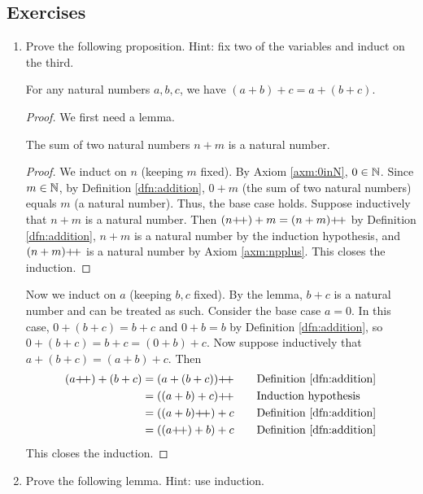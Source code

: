\documentclass[../main.tex]{subfiles}
\begin{document}
\subsection*{Exercises}
\begin{enumerate}[ref={\thesection.\arabic*}]
    \item \label{exr:2.2.1}Prove the following proposition. Hint: fix two of the variables and induct on the third.
    \begin{prp}\label{prp:associativity}
        For any natural numbers $a,b,c$, we have $(a+b)+c=a+(b+c)$.
        \begin{proof}
            We first need a lemma.
            \begin{lem}\label{lem:sumNaturalsIsNatural}
                The sum of two natural numbers $n+m$ is a natural number.
                \begin{proof}
                    We induct on $n$ (keeping $m$ fixed). By Axiom \ref{axm:0inN}, $0\in\mathbb{N}$. Since $m\in\mathbb{N}$, by Definition \ref{dfn:addition}, $0+m$ (the sum of two natural numbers) equals $m$ (a natural number). Thus, the base case holds. Suppose inductively that $n+m$ is a natural number. Then $(n{+\!+})+m=(n+m){+\!+}$ by Definition \ref{dfn:addition}, $n+m$ is a natural number by the induction hypothesis, and $(n+m){+\!+}$ is a natural number by Axiom \ref{axm:npplus}. This closes the induction.
                \end{proof}
            \end{lem}
            Now we induct on $a$ (keeping $b,c$ fixed). By the lemma, $b+c$ is a natural number and can be treated as such. Consider the base case $a=0$. In this case, $0+(b+c)=b+c$ and $0+b=b$ by Definition \ref{dfn:addition}, so $0+(b+c)=b+c=(0+b)+c$. Now suppose inductively that $a+(b+c)=(a+b)+c$. Then
            \begin{align*}
                (a\pplus)+(b+c) &= (a+(b+c))\pplus\tag*{Definition \ref{dfn:addition}}\\
                &= ((a+b)+c)\pplus\tag*{Induction hypothesis}\\
                &= ((a+b)\pplus)+c\tag*{Definition \ref{dfn:addition}}\\
                &= ((a\pplus)+b)+c\tag*{Definition \ref{dfn:addition}}
            \end{align*}
            This closes the induction.
        \end{proof}
    \end{prp}
    \item \label{exr:2.2.2}Prove the following lemma. Hint: use induction.

\end{enumerate}
\end{document}
